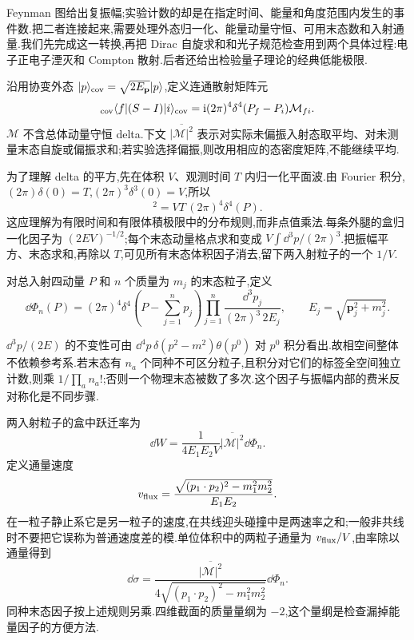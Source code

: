 \label{ch:qed-processes}

Feynman 图给出复振幅;实验计数的却是在指定时间、能量和角度范围内发生的事件数.把二者连接起来,需要处理外态归一化、能量动量守恒、可用末态数和入射通量.我们先完成这一转换,再把 Dirac 自旋求和和光子规范检查用到两个具体过程:电子正电子湮灭和 Compton 散射.后者还给出检验量子理论的经典低能极限.


沿用协变外态 $\lvert p\rangle_{\rm cov}=\sqrt{2E_{\mathbf p}}\lvert p\rangle$,定义连通散射矩阵元
\begin{equation}
 {}_{\rm cov}\langle f\rvert(S-I)\lvert i\rangle_{\rm cov}
 =\mathrm i(2\pi)^4\delta^4(P_f-P_i)\mathcal M_{fi}.
 \label{eq:invariant-amplitude}
\end{equation}
$\mathcal M$ 不含总体动量守恒 delta.下文 $\overline{|\mathcal M|^2}$ 表示对实际未偏振入射态取平均、对未测量末态自旋或偏振求和;若实验选择偏振,则改用相应的态密度矩阵,不能继续平均.

为了理解 delta 的平方,先在体积 $V$、观测时间 $T$ 内归一化平面波.由 Fourier 积分,$(2\pi)\delta(0)=T$,$(2\pi)^3\delta^3(0)=V$,所以
\begin{equation}
 [(2\pi)^4\delta^4(P)]^2=VT\,(2\pi)^4\delta^4(P).
\end{equation}
这应理解为有限时间和有限体積极限中的分布规则,而非点值乘法.每条外腿的盒归一化因子为 $(2EV)^{-1/2}$;每个末态动量格点求和变成 $V\int\dd^3p/(2\pi)^3$.把振幅平方、末态求和,再除以 $T$,可见所有末态体积因子消去,留下两入射粒子的一个 $1/V$.

\begin{definition}[相空间]
对总入射四动量 $P$ 和 $n$ 个质量为 $m_j$ 的末态粒子,定义
\begin{equation}
 \dd\Phi_n(P)=(2\pi)^4\delta^4\!\left(P-\sum_{j=1}^np_j\right)
 \prod_{j=1}^n\frac{\dd^3p_j}{(2\pi)^3\,2E_j},
 \qquad E_j=\sqrt{\mathbf p_j^2+m_j^2}.
 \label{eq:phase-space}
\end{equation}
\end{definition}

$\dd^3p/(2E)$ 的不变性可由 $\dd^4p\,\delta(p^2-m^2)\theta(p^0)$ 对 $p^0$ 积分看出.故相空间整体不依赖参考系.若末态有 $n_a$ 个同种不可区分粒子,且积分对它们的标签全空间独立计数,则乘 $1/\prod_a n_a!$;否则一个物理末态被数了多次.这个因子与振幅内部的费米反对称化是不同步骤.

两入射粒子的盒中跃迁率为
\begin{equation}
 \dd W=\frac{1}{4E_1E_2V}\overline{|\mathcal M|^2}\dd\Phi_n.
\end{equation}
定义通量速度
\begin{equation}
 v_{\rm flux}=\frac{\sqrt{(p_1\cdot p_2)^2-m_1^2m_2^2}}{E_1E_2}.
\end{equation}
在一粒子静止系它是另一粒子的速度,在共线迎头碰撞中是两速率之和;一般非共线时不要把它误称为普通速度差的模.单位体积中的两粒子通量为 $v_{\rm flux}/V$,由率除以通量得到
\begin{equation}
 \dd\sigma=
 \frac{\overline{|\mathcal M|^2}}{4\sqrt{(p_1\cdot p_2)^2-m_1^2m_2^2}}
 \dd\Phi_n.
 \label{eq:cross-section-general}
\end{equation}
同种末态因子按上述规则另乘.四维截面的质量量纲为 $-2$,这个量纲是检查漏掉能量因子的方便方法.


